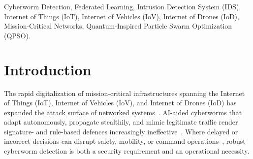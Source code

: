 \documentclass[conference]{IEEEtran}
\begin{document}
\begin{abstract}
AI-aided cyberworms that adapt their propagation and mimic legitimate traffic threaten mission-critical IoT/IoV/IoD networks, where detectors must remain accurate, lightweight, and robust across distributed sites. This paper proposes CONQUEST, a context-aware, quantum-inspired intrusion detection framework that integrates causal context features, variable-qubit quantum-inspired particle swarm optimization (QPSO) for feature selection, and an LSTM(+VAE) temporal classifier, trained centrally or by horizontal federated learning. \textcolor{black}{Under a leakage-free temporal evaluation on ACI-IoT, CONQUEST achieves 97.13\% accuracy and F1-score, 0.9924 AUC, and the lowest missed-attack rate (3.33\%) among the evaluated pipelines.} \textcolor{black}{Multi-seed ablations show that detection is robust to the QPSO register size $Q\in\{1,\dots,10\}$ (Friedman $p\geq0.46$) and that context features and label-aware selection are complementary.} \textcolor{black}{The deployed detector classifies a traffic window in 2.98\,ms with 541\,MB peak memory.} \textcolor{black}{Under independent and identically distributed (IID) client
partitions, quantity-skew, and Dirichlet partitions, federated CONQUEST stays within 0.8\,pp of centralized F1, with a worst-client F1 of 96.37\% under quantity skew.} These results establish CONQUEST as a reproducible, deployable cyberworm detector for mission-critical networks.
\end{abstract}

\begin{IEEEkeywords}
Cyberworm Detection, Federated Learning, Intrusion Detection System (IDS), Internet of Things (IoT), Internet of Vehicles (IoV), Internet of Drones (IoD), Mission-Critical Networks, Quantum-Inspired Particle Swarm Optimization (QPSO).  
\end{IEEEkeywords}


\section{Introduction}
\label{sec:introduction}
The rapid digitalization of mission-critical infrastructures spanning
the Internet of Things (IoT), Internet of Vehicles (IoV), and Internet
of Drones (IoD) has expanded the attack surface of networked
systems~\cite{dritsas, ajakwe2024facets}. AI-aided cyberworms that
adapt autonomously, propagate stealthily, and mimic legitimate
traffic render signature- and rule-based defences increasingly
ineffective~\cite{khezri}. Where delayed or incorrect decisions can
disrupt safety, mobility, or command operations~\cite{amadi2026blockchain},
robust cyberworm detection is both a security requirement and an
operational necessity.
\end{document}
